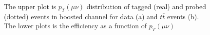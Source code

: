 \begin{figure}[ht]
	\begin{center}
		\caption{The upper plot is $p_{T}(\mu\nu)$ distribution of tagged (real) and probed (dotted) events in boosted channel for data (a) and $t\bar{t}$ events (b). The lower plots is the efficiency as a function of $p_{T}(\mu\nu)$}
		\label{Fig:eff_met_merged}
	\end{center}
\end{figure}

